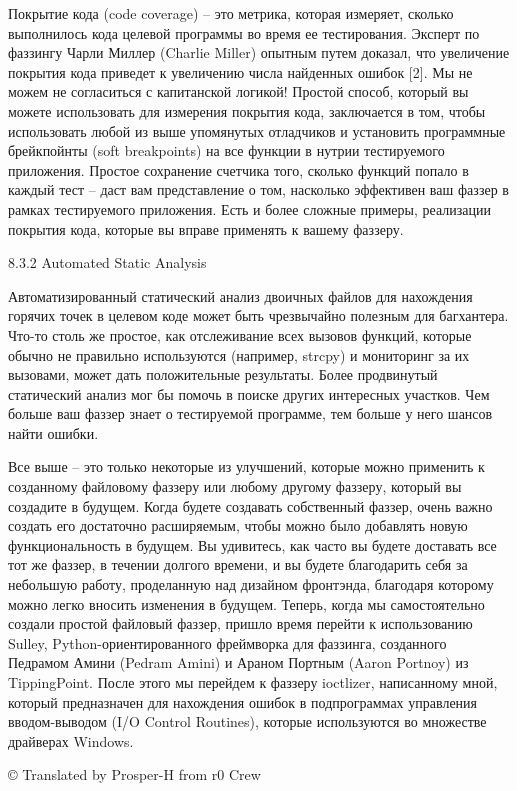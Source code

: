 \documentclass[12pt, a4paper, oneside]{book}
\begin{document}
Покрытие кода (code coverage) – это метрика, которая измеряет, сколько выполнилось кода целевой программы во время ее тестирования. Эксперт по фаззингу Чарли Миллер (Charlie Miller) опытным путем доказал, что увеличение покрытия кода приведет к увеличению числа найденных ошибок [2]. Мы не можем не согласиться с капитанской логикой! Простой способ, который вы можете использовать для измерения покрытия кода, заключается в том, чтобы использовать любой из выше упомянутых отладчиков и установить программные брейкпойнты (soft breakpoints) на все функции в нутрии тестируемого приложения. Простое сохранение счетчика того, сколько функций попало в каждый тест – даст вам представление о том, насколько эффективен ваш фаззер в рамках тестируемого приложения. Есть и более сложные примеры, реализации покрытия кода, которые вы вправе применять к вашему фаззеру.

8.3.2 Automated Static Analysis

Автоматизированный статический анализ двоичных файлов для нахождения горячих точек в целевом коде может быть чрезвычайно полезным для багхантера. Что-то столь же простое, как отслеживание всех вызовов функций, которые обычно не правильно используются (например, strcpy) и мониторинг за их вызовами, может дать положительные результаты. Более продвинутый статический анализ мог бы помочь в поиске других интересных участков. Чем больше ваш фаззер знает о тестируемой программе, тем больше у него шансов найти ошибки.

Все выше – это только некоторые из улучшений, которые можно применить к созданному файловому фаззеру или любому другому фаззеру, который вы создадите в будущем. Когда будете создавать собственный фаззер, очень важно создать его достаточно расширяемым, чтобы можно было добавлять новую функциональность в будущем. Вы удивитесь, как часто вы будете доставать все тот же фаззер, в течении долгого времени, и вы будете благодарить себя за небольшую работу, проделанную над дизайном фронтэнда, благодаря которому можно легко вносить изменения в будущем. Теперь, когда мы самостоятельно создали простой файловый фаззер, пришло время перейти к использованию Sulley, Python-ориентированного фреймворка для фаззинга, созданного Педрамом Амини (Pedram Amini) и Араном Портным (Aaron Portnoy) из TippingPoint. После этого мы перейдем к фаззеру ioctlizer, написанному мной, который предназначен для нахождения ошибок в подпрограммах управления вводом-выводом (I/O Control Routines), которые используются во множестве драйверах Windows.


© Translated by Prosper-H from r0 Crew
\end{document}
